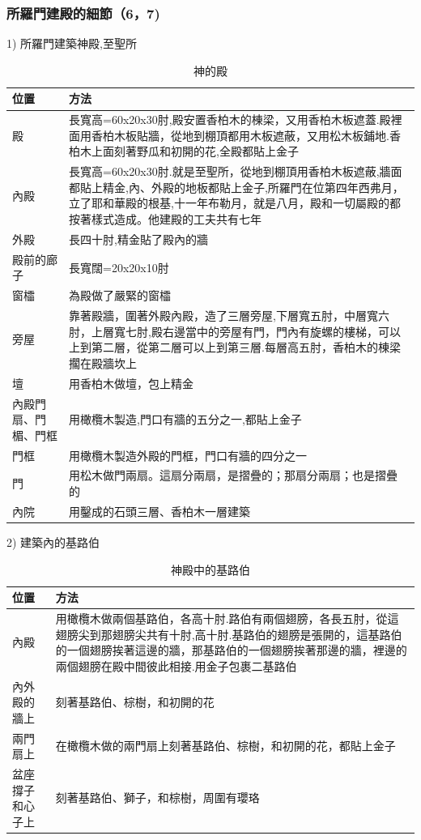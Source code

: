 \documentclass{ctexart}
\begin{document}
\subsubsection{所羅門建殿的細節（6，7)}
\begin{description}  
\item   1) 所羅門建築神殿,至聖所
\begin{table}[!hbp]
\centering
\begin{tabular}{|p{2cm}|p{12cm}|}
\hline
\hline
位置      &方法    \\\hline\hline
 殿   & 長寬高=60x20x30肘,殿安置香柏木的棟梁，又用香柏木板遮蓋.殿裡面用香柏木板貼牆，從地到棚頂都用木板遮蔽，又用松木板鋪地.香柏木上面刻著野瓜和初開的花,全殿都貼上金子\\\hline
 內殿& 長寬高=60x20x30肘.就是至聖所，從地到棚頂用香柏木板遮蔽,牆面都貼上精金,內、外殿的地板都貼上金子,所羅門在位第四年西弗月，立了耶和華殿的根基,十一年布勒月，就是八月，殿和一切屬殿的都按著樣式造成。他建殿的工夫共有七年\\\hline
 外殿& 長四十肘,精金貼了殿內的牆\\\hline
殿前的廊子   & 長寬闊=20x20x10肘  \\\hline
窗櫺    & 為殿做了嚴緊的窗櫺\\\hline
旁屋& 靠著殿牆，圍著外殿內殿，造了三層旁屋,下層寬五肘，中層寬六肘，上層寬七肘,殿右邊當中的旁屋有門，門內有旋螺的樓梯，可以上到第二層，從第二層可以上到第三層.每層高五肘，香柏木的棟梁擱在殿牆坎上\\\hline
壇& 用香柏木做壇，包上精金 \\\hline
內殿門扇、門楣、門框& 用橄欖木製造,門口有牆的五分之一,都貼上金子 \\\hline
門框& 用橄欖木製造外殿的門框，門口有牆的四分之一\\\hline
門& 用松木做門兩扇。這扇分兩扇，是摺疊的；那扇分兩扇；也是摺疊的\\\hline
內院& 用鑿成的石頭三層、香柏木一層建築\\\hline
\end{tabular}
\caption{神的殿}
\end{table}

\item   2) 建築內的基路伯 
\begin{table}[!hbp]
\centering
\begin{tabular}{|p{2.5cm}|p{12cm}|}
\hline
\hline
位置      &方法    \\\hline\hline
 內殿    & 用橄欖木做兩個基路伯，各高十肘.路伯有兩個翅膀，各長五肘，從這翅膀尖到那翅膀尖共有十肘,高十肘.基路伯的翅膀是張開的，這基路伯的一個翅膀挨著這邊的牆，那基路伯的一個翅膀挨著那邊的牆，裡邊的兩個翅膀在殿中間彼此相接.用金子包裹二基路伯    \\\hline
內外殿的牆上   & 刻著基路伯、棕樹，和初開的花   \\\hline
兩門扇上   & 在橄欖木做的兩門扇上刻著基路伯、棕樹，和初開的花，都貼上金子\\\hline
盆座撐子和心子上 & 刻著基路伯、獅子，和棕樹，周圍有瓔珞\\\hline
\end{tabular}
\caption{神殿中的基路伯}
\end{table}


\end{description}
\end{document}
